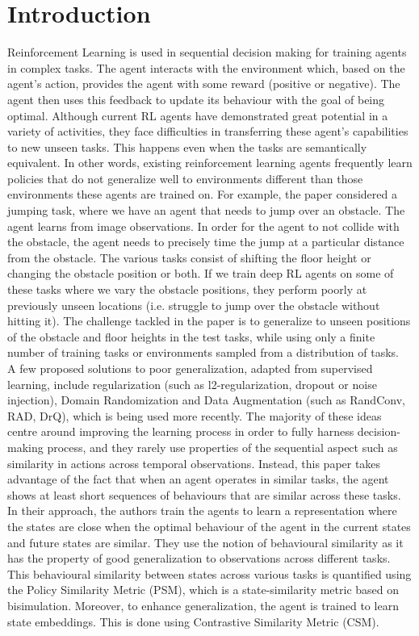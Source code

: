 \documentclass{usiinftr}
\begin{document}
\section{Introduction}
Reinforcement Learning is used in sequential decision making for training agents in complex tasks. The agent interacts with the environment which, based on the agent's action, provides the agent with some reward (positive or negative). The agent then uses this feedback to update its behaviour with the goal of being optimal. Although current RL agents have demonstrated great potential in a variety of activities, they face difficulties in transferring these agent's capabilities to new unseen tasks. This happens even when the tasks are semantically equivalent. In other words, existing reinforcement learning agents frequently learn policies that do not generalize well to environments different than those environments these agents are trained on. For example, the paper considered a jumping task, where we have an agent that needs to jump over an obstacle. The agent learns from image observations. In order for the agent to not collide with the obstacle, the agent needs to precisely time the jump at a particular distance from the obstacle. The various tasks consist of shifting the floor height or changing the obstacle position or both. If we train deep RL agents on some of these tasks where we vary the obstacle positions, they perform poorly at previously unseen locations (i.e. struggle to jump over the obstacle without hitting it).  The challenge tackled in the paper is to generalize to unseen positions of the obstacle and floor heights in the test tasks, while using only a finite number of training tasks or environments sampled from a distribution of tasks.
\\
A few proposed solutions to poor generalization, adapted from supervised learning, include regularization (such as l2-regularization, dropout or noise injection), Domain Randomization and Data Augmentation (such as RandConv, RAD, DrQ), which is being used more recently. The majority of these ideas centre around improving the learning process in order to fully harness decision-making process, and they rarely use properties of the sequential aspect such as similarity in actions across temporal observations. Instead, this paper takes advantage of the fact that when an agent operates in similar tasks, the agent shows at least short sequences of behaviours that are similar across these tasks.
In their approach, the authors train the agents to learn a representation where the states are close when the optimal behaviour of the agent in the current states and future states are similar. They use the notion of behavioural similarity as it has the property of good generalization to observations across different tasks. This behavioural similarity between states across various tasks is quantified using the Policy Similarity Metric (PSM), which is a state-similarity metric based on bisimulation. Moreover, to enhance generalization, the agent is trained to learn state embeddings. This is done using Contrastive Similarity Metric (CSM).
\end{document}
